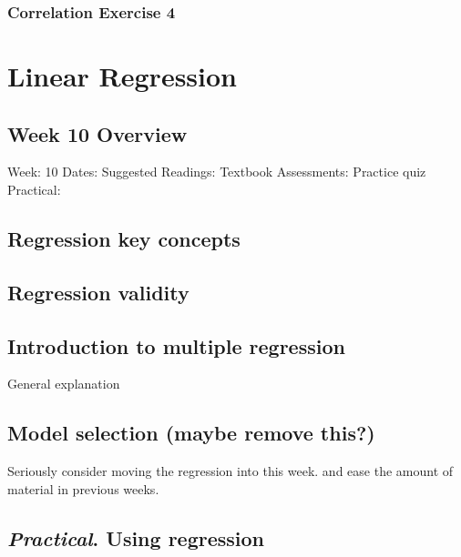 \documentclass[
]{scrbook}
\begin{document}
\hypertarget{correlation-exercise-4}{%
\section{Correlation Exercise 4}\label{correlation-exercise-4}}

\hypertarget{part-linear-regression}{%
\part{Linear Regression}\label{part-linear-regression}}

\hypertarget{Week10}{%
\chapter*{Week 10 Overview}\label{Week10}}

Week: 10
Dates:
Suggested Readings: Textbook
Assessments: Practice quiz
Practical:

\hypertarget{regression-key-concepts}{%
\chapter{Regression key concepts}\label{regression-key-concepts}}

\hypertarget{regression-validity}{%
\chapter{Regression validity}\label{regression-validity}}

\hypertarget{introduction-to-multiple-regression}{%
\chapter{Introduction to multiple regression}\label{introduction-to-multiple-regression}}

General explanation

\hypertarget{model-selection-maybe-remove-this}{%
\chapter{Model selection (maybe remove this?)}\label{model-selection-maybe-remove-this}}

Seriously consider moving the regression into this week. and ease the amount of material in previous weeks.

\hypertarget{practical.-using-regression}{%
\chapter{\texorpdfstring{\emph{Practical}. Using regression}{Practical. Using regression}}\label{practical.-using-regression}}
\end{document}
